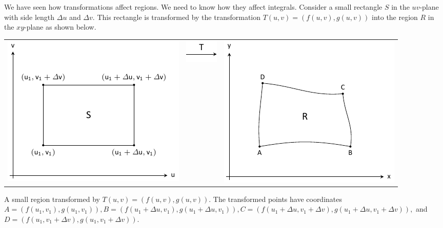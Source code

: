 We have seen how transformations affect regions.  We need to know how they affect integrals.  Consider a small rectangle $S$ in the $uv$-plane with side length $\Delta u$ and $\Delta v.$  This rectangle is transformed by the transformation $T(u,v) = (f(u,v),g(u,v))$ into the region $R$ in the $xy$-plane as shown below.

\addtocounter{figure}{1}
\vskip 10pt
\hskip-50pt
\noindent\begin{minipage}[t]{\textwidth+100pt}
	\begin{tabular}{ccc}
		\includegraphics[align=c]{figures/fig13_jacobian_area_transformation_a} & \includegraphics[align=c]{figures/fig13_jacobian_area_transformation_b} & \includegraphics[align=c]{figures/fig13_jacobian_area_transformation_c}
	\end{tabular}
	\captionsetup{type=figure}%
	\caption{A small region transformed by $T(u,v) = (f(u,v),g(u,v))$.  The transformed points have coordinates $A = (f(u_1,v_1),g(u_1,v_1)), B = (f(u_1+\Delta u, v_1), g(u_1+\Delta u, v_1)), C = (f(u_1+ \Delta u,v_1 + \Delta v), g(u_1 + \Delta u, v_1 + \Delta v)),$ and $D = (f(u_1,v_1 + \Delta v),g(u_1, v_1 + \Delta v)).$}
	\label{fig:area_transformation}
\end{minipage}
\\
\vskip10pt
\addtocounter{figure}{-2}

